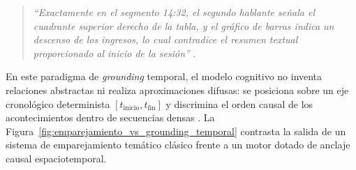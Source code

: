 \begin{quote}
\textit{``Exactamente en el segmento 14:32, el segundo hablante señala el cuadrante superior derecho de la tabla, y el gráfico de barras indica un descenso de los ingresos, lo cual contradice el resumen textual proporcionado al inicio de la sesión''} \cite{mixpeek_chunking}. %
\end{quote}

En este paradigma de \textit{grounding} temporal, el modelo cognitivo no inventa relaciones abstractas ni realiza aproximaciones difusas: se posiciona sobre un eje cronológico determinista $[t_{\text{inicio}}, t_{\text{fin}}]$ y discrimina el orden causal de los acontecimientos dentro de secuencias densas \cite{gemini_emb2_docs, mixpeek_chunking}. %
La Figura~\ref{fig:emparejamiento_vs_grounding_temporal} contrasta la salida de un sistema de emparejamiento temático clásico frente a un motor dotado de anclaje causal espaciotemporal. %

